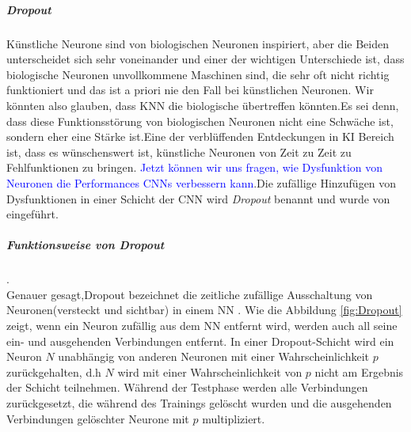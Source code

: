 \documentclass[12pt,a4paper]{scrartcl}
\numberwithin{equation}{section}
\begin{document}
\subparagraph{Dropout}  \label{Dropout}
Künstliche Neurone sind von biologischen Neuronen inspiriert, aber die Beiden unterscheidet sich sehr voneinander und einer der wichtigen Unterschiede ist, dass biologische Neuronen unvollkommene Maschinen sind, die sehr oft nicht richtig funktioniert und das ist a priori nie den Fall bei  künstlichen Neuronen. Wir könnten also glauben, dass \ac{KNN} die biologische übertreffen könnten.Es sei denn, dass diese Funktionsstörung von biologischen Neuronen nicht eine Schwäche ist, sondern eher eine Stärke ist.Eine der verblüffenden Entdeckungen in \ac{KI} Bereich ist, dass es wünschenswert ist, künstliche Neuronen von Zeit zu Zeit zu Fehlfunktionen zu bringen\cite{1}. \textcolor{blue}{Jetzt können wir uns fragen, wie Dysfunktion von Neuronen die Performances \acsp{CNN} verbessern kann}.Die zufällige Hinzufügen von Dysfunktionen in einer Schicht der \ac{CNN} wird \textit{Dropout} benannt und wurde von \cite[Geoffrey E. et al]{2} eingeführt.
\subparagraph{Funktionsweise von Dropout}.\\
Genauer gesagt,Dropout bezeichnet die zeitliche zufällige Ausschaltung von Neuronen(versteckt und sichtbar)  in einem  \ac{NN} \cite{3}. Wie die Abbildung \ref{fig:Dropout} zeigt, wenn ein Neuron zufällig aus dem \ac{NN} entfernt wird, werden auch all seine ein- und ausgehenden Verbindungen entfernt.
In einer Dropout-Schicht wird ein Neuron $ \textit{N} $ unabhängig von anderen Neuronen mit einer Wahrscheinlichkeit $ {p} $ zurückgehalten, d.h $ \textit{N} $ wird mit einer Wahrscheinlichkeit von $ {p} $ nicht am Ergebnis der Schicht teilnehmen. Während der Testphase  werden alle Verbindungen zurückgesetzt, die während des Trainings gelöscht wurden und die ausgehenden Verbindungen gelöschter Neurone mit $ p $   multipliziert.
\end{document}
